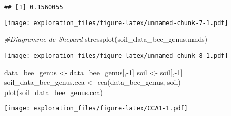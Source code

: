 \documentclass[
]{article}
\newenvironment{Shaded}{\begin{snugshade}}{\end{snugshade}}
\newcommand{\AttributeTok}[1]{\textcolor[rgb]{0.77,0.63,0.00}{#1}}
\newcommand{\CommentTok}[1]{\textcolor[rgb]{0.56,0.35,0.01}{\textit{#1}}}
\newcommand{\DecValTok}[1]{\textcolor[rgb]{0.00,0.00,0.81}{#1}}
\newcommand{\FloatTok}[1]{\textcolor[rgb]{0.00,0.00,0.81}{#1}}
\newcommand{\FunctionTok}[1]{\textcolor[rgb]{0.00,0.00,0.00}{#1}}
\newcommand{\NormalTok}[1]{#1}
\newcommand{\OtherTok}[1]{\textcolor[rgb]{0.56,0.35,0.01}{#1}}
\newcommand{\SpecialCharTok}[1]{\textcolor[rgb]{0.00,0.00,0.00}{#1}}
\newcommand{\StringTok}[1]{\textcolor[rgb]{0.31,0.60,0.02}{#1}}
\begin{document}
\begin{verbatim}
## [1] 0.1560055
\end{verbatim}

\begin{Shaded}
\end{Shaded}

\texttt{[image: exploration\_files/figure-latex/unnamed-chunk-7-1.pdf]}

\begin{Shaded}
\begin{Highlighting}[]
\CommentTok{\#Diagramme de Shepard}
\FunctionTok{stressplot}\NormalTok{(soil\_data\_bee\_genus.nmds)}
\end{Highlighting}
\end{Shaded}

\texttt{[image: exploration\_files/figure-latex/unnamed-chunk-8-1.pdf]}

\begin{Shaded}
\begin{Highlighting}[]
\NormalTok{data\_bee\_genus }\OtherTok{\textless{}{-}}\NormalTok{ data\_bee\_genus[,}\SpecialCharTok{{-}}\DecValTok{1}\NormalTok{]}
\NormalTok{soil }\OtherTok{\textless{}{-}}\NormalTok{ soil[,}\SpecialCharTok{{-}}\DecValTok{1}\NormalTok{]}
\NormalTok{soil\_data\_bee\_genus.cca }\OtherTok{\textless{}{-}} \FunctionTok{cca}\NormalTok{(data\_bee\_genus, soil)}
\FunctionTok{plot}\NormalTok{(soil\_data\_bee\_genus.cca)}
\end{Highlighting}
\end{Shaded}

\texttt{[image: exploration\_files/figure-latex/CCA1-1.pdf]}
\end{document}
